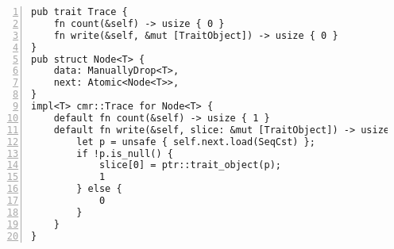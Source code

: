 \begin{lstlisting}[caption=Definition of the \code{Trace} trait and a sample implementation for a
  linked list node. The impementation uses \emph{specialization} (\cref{sec:specialization})
  as the implementation of \code{Node}s containing data that itself is \code{Trace} is different.,
  numbers=left,
  numberstyle=\color{gray}\ttfamily{}T,
  ]
pub trait Trace {
    fn count(&self) -> usize { 0 }
    fn write(&self, &mut [TraitObject]) -> usize { 0 }
}
pub struct Node<T> {
    data: ManuallyDrop<T>,
    next: Atomic<Node<T>>,
}
impl<T> cmr::Trace for Node<T> {
    default fn count(&self) -> usize { 1 }
    default fn write(&self, slice: &mut [TraitObject]) -> usize {
        let p = unsafe { self.next.load(SeqCst) };
        if !p.is_null() {
            slice[0] = ptr::trait_object(p);
            1
        } else {
            0
        }
    }
}\end{lstlisting}

